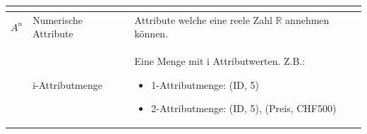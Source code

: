 \begin{table}[H]
\begin{tabular}{ | c | C{2.5cm} | p{10cm} |}
\begin{itemize}
			\end{itemize} \\ \hline
		$A^n$ & Numerische Attribute & Attribute welche eine reele Zahl $\mathbb{R}$ annehmen können.\\ \hline
		& i-Attributmenge & Eine Menge mit i Attributwerten. Z.B.:
			\begin{itemize}
			\item 1-Attributmenge: { (ID, 5) }
			\item 2-Attributmenge: { (ID, 5), (Preis, CHF500)}
			\end{itemize}\\ \hline 
	\end{tabular} 
\end{table}